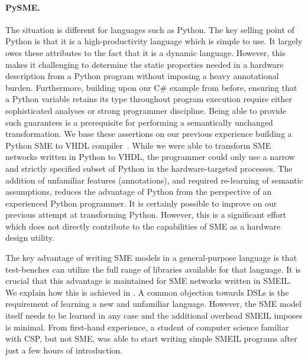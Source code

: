 \paragraph{PySME.}
The situation is different for languages such as Python. The key selling point
of Python is that it is a high-productivity language which is simple to use. It
largely owes these attributes to the fact that it is a dynamic
language. However, this makes it challenging to determine the static properties
needed in a hardware description from a Python program without imposing a heavy
annotational burden. Furthermore, building upon our C\# example from before,
ensuring that a Python variable retains its type throughout program execution
require either sophisticated analyses or strong programmer discipline. Being
able to provide such guarantees is a prerequisite for performing a semantically
unchanged transformation. We base these assertions on our previous experience
building a Python SME to VHDL compiler~\cite{asheim2016vhdl}. While we were able
to transform SME networks written in Python to VHDL, the programmer could only
use a narrow and strictly specified subset of Python in the hardware-targeted
processes. The addition of unfamiliar features (annotations), and required
re-learning of semantic assumptions, reduces the advantage of Python from the
perspective of an experienced Python programmer. It is certainly possible to
improve on our previous attempt at transforming Python. However, this is a
significant effort which does not directly contribute to the capabilities of SME
as a hardware design utility.



The key advantage of writing SME models in a general-purpose language is that
test-benches can utilize the full range of libraries available for that
language. It is crucial that this advantage is maintained for SME networks
written in SMEIL. We explain how this is achieved in  . A common
objection towards DSLs is the requirement of learning a new and unfamiliar
language. However, the SME model itself needs to be learned in any case and the
additional overhead SMEIL imposes is minimal. From first-hand experience, a
student of computer science familiar with CSP, but not SME, was able to start
writing simple SMEIL programs after just a few hours of introduction.

